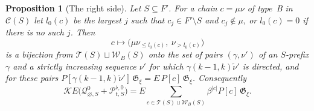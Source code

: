 \documentclass[11pt]{article}
\newtheorem{proposition}{Proposition}
\newcommand{\G}{\mathfrak{G}}
\begin{document}
\begin{proposition}[The right side]\label{prop:right-side}
Let $S\subseteq F'$. For a chain $c=\mu\nu$ of type~B in
$\mathcal C(S)$ let $l_0(c)$ be the largest $j$ such that
$c_j\in F'\setminus S$ and $c_j\notin\mu$, or $l_0(c)=0$ if there is
no such $j$. Then
\[
 c\longmapsto\bigl(\mu\nu_{\leq l_0(c)},\ \nu_{>l_0(c)}\bigr)
\]
is a bijection from $\mathcal T(S)\sqcup\mathcal W_B(S)$ onto the set
of pairs $(\gamma,\nu')$ of an $S$-prefix $\gamma$ and a strictly
increasing sequence $\nu'$ for which $\gamma(k-1,k)\tilde\nu'$ is
directed, and for these pairs
$P[\gamma(k-1,k)\tilde\nu']\,\G_\xi=E\,P[c]\,\G_\xi$. Consequently
\[
 \mathcal KE\bigl(\mathcal Q^0_{\varnothing,S}+\mathcal P^{\flat,0}_{t,S}\bigr)
 =E\sum_{c\in\mathcal T(S)\sqcup\mathcal W_B(S)}\beta^{|c|}P[c]\,\G_\xi .
\]
\end{proposition}
\end{document}
